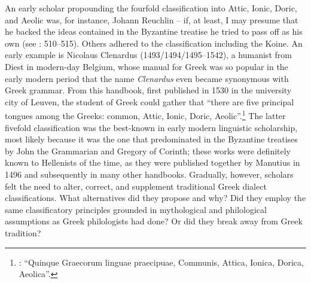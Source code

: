 {An early scholar propounding the fourfold classification into Attic, Ionic, Doric, and Aeolic was, for instance, Johann Reuchlin – if, at least, I may presume that he backed the ideas contained in the Byzantine treatise he tried to pass off as his own (see \citealt{VanRooy2014}: 510–515). Others adhered to the classification including the Koine. An early example is Nicolaus Clenardus (1493/1494/1495–1542), a humanist from Diest in modern-day Belgium, whose manual for Greek was so popular in the early modern period that the name \textit{Clenardus} even became synonymous with Greek grammar. From this handbook, first published in 1530 in the university city of Leuven, the student of Greek could gather that “there are five principal tongues among the Greeks: common, Attic, Ionic, Doric, Aeolic”.\footnote{\citet[7 (misprint for 6)]{Clenardus1530}: “Quinque Graecorum linguae praecipuae, Communis, Attica, Ionica, Dorica, Aeolica”.} The latter fivefold classification was the best-known in early modern linguistic scholarship, most likely because it was the one that predominated in the Byzantine treatises by John the Grammarian and Gregory of Corinth; these works were definitely known to Hellenists of the time, as they were published together by Manutius in 1496 and subsequently in many other handbooks. Gradually, however, scholars felt the need to alter, correct, and supplement traditional Greek dialect classifications. What alternatives did they propose and why? Did they employ the same classificatory principles grounded in mythological and philological assumptions as Greek philologists had done? Or did they break away from Greek tradition?

}
